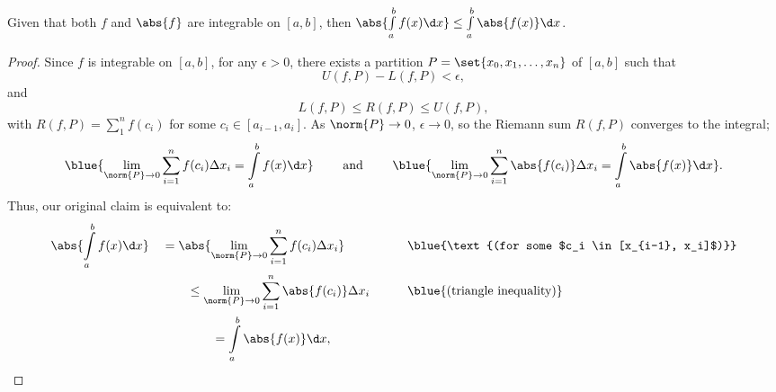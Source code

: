   \begin{claim}
    Given that both $f$ and $\abs{f}$ are integrable on $[a, b]$,
    then $\abs{\int\limits_a^b f(x) \d x} \leq \int\limits_a^b \abs{f(x)} \d x$.
  \end{claim}
  \begin{proof}
    Since $f$ is integrable on $[a, b]$, for any $\epsilon > 0$,
    there exists a partition $P = \set{x_0, x_1, \ldots, x_n}$ of $[a, b]$
    such that
    \[ U(f, P) - L(f, P) < \epsilon, \]
    and \[ L(f, P) \leq R(f, P) \leq U(f, P), \]
    with $\displaystyle R(f, P) = \sum\limits_1^n f(c_i)$ for some
    $c_i \in [a_{i-1}, a_i]$.
    As $\norm{P} \to 0$, $\epsilon \to 0$, so the Riemann sum $R(f, P)$
    converges to the integral;
    \[
      \blue{
        \lim_{\norm{P} \to 0} \sum_{i=1}^n f(c_i) \Delta x_i =
        \int\limits_a^b f(x) \d x}
      \qquad \text{ and } \qquad
      \blue{
        \lim_{\norm{P} \to 0} \sum_{i=1}^n \abs{f(c_i)} \Delta x_i =
        \int\limits_a^b \abs{f(x)} \d x}.
    \]
    Thus, our original claim is equivalent to:
    \begin{alignat*}{5}
      &\abs{\int\limits_a^b f(x) \d x} &&= \abs{\lim_{\norm{P} \to 0}
        \sum_{i=1}^n f(c_i) \Delta x_i}
        &&\qquad \blue{\text{(for some $c_i \in [x_{i-1}, x_i]$)}}\\
      & &&\qquad \leq \lim_{\norm{P} \to 0} \sum_{i=1}^n \abs{f(c_i)} \Delta x_i
        &&\qquad \blue{\text{(triangle inequality)}} \\
      & &&\qquad \qquad= \int\limits_a^b \abs{f(x)} \d x,
    \end{alignat*}
  \end{proof}
  \vspace{-3em}
